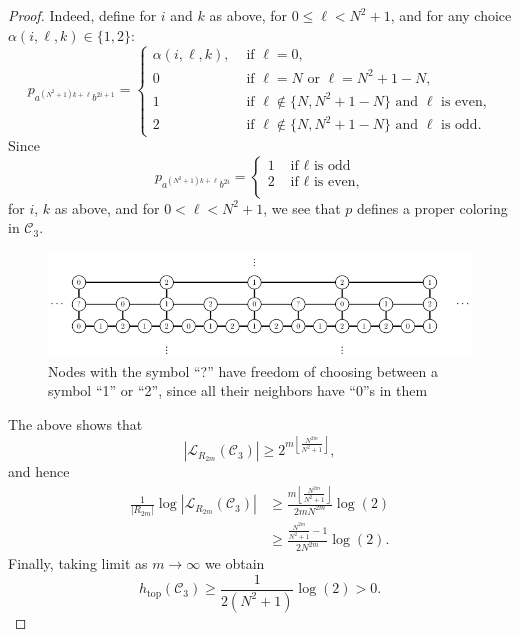 \documentclass[cupthm,crop,info]{CUP-JNL-ETS}%
\theoremstyle{cupplain}
\theoremstyle{cupdefinition}
\theoremstyle{cupremark}
\theoremstyle{cupproof}
\newtheorem{proof}{Proof}
\numberwithin{equation}{section}
\def\htop{h_{\mathrm{top}}}
\begin{document}
\begin{proof}
	Indeed, define for $i$ and $k$ as above, for $0\le \ell <N^2+1$, and for any choice $\alpha(i,\ell,k)\in\{1,2\}$:
	$$
	p_{a^{(N^2+1)k+\ell}b^{2i+1}}=\begin{cases}
	\alpha(i,\ell,k), &\text{ if }\ell=0,\\
	0 \ &\text{ if } \ell=N \text{ or }\ell=N^2+1-N,\\
	1\ &\text{ if } \ell\notin\{N,N^2+1-N\} \text{ and }\ell \text{ is even,}\\
	2\ &\text{ if } \ell\notin\{N,N^2+1-N\} \text{ and }\ell \text{ is odd}.
	\end{cases}
	$$
	Since $$p_{a^{(N^2+1)k+\ell}b^{2i}}=\begin{cases}
	1 &\text{ if }\ell \text{ is odd}\\
	2 &\text{ if }\ell \text{ is even,}\\
	\end{cases}$$
	for $i$, $k$ as above, and for $0<\ell<N^2+1$,
	we see that $p$ defines a proper coloring in $\mathcal{C}_3$.
	

	\begin{figure}
		\centering
\includegraphics[]{freespace_entropy.pdf}
		\caption{Nodes with the symbol ``?'' have freedom of choosing between a symbol ``1'' or ``2'', since all their neighbors have ``0''s in them}
	\end{figure}
	
	The above shows that
	$$
	|\mathcal{L}_{R_{2m}}(\mathcal{C}_3)|\ge 2^{m\left\lfloor \frac{N^{2m}}{N^2+1}\right\rfloor },
	$$
	and hence
	\begin{align*}
	\frac{1}{|R_{2m}|}\log |\mathcal{L}_{R_{2m}}(\mathcal{C}_3)|&\ge\frac{m\left\lfloor \frac{N^{2m}}{N^2+1}\right\rfloor}{2mN^{2m}}\log(2) \\
	&\ge \frac{\frac{N^{2m}}{N^2+1}-1}{2N^{2m}}\log(2).
	\end{align*}
	Finally, taking limit as $m\to\infty$ we obtain
	$$
	\htop(\mathcal{C}_3)\ge \frac{1}{2(N^2+1)}\log(2)>0.
	$$
\end{proof}	
\end{document}
